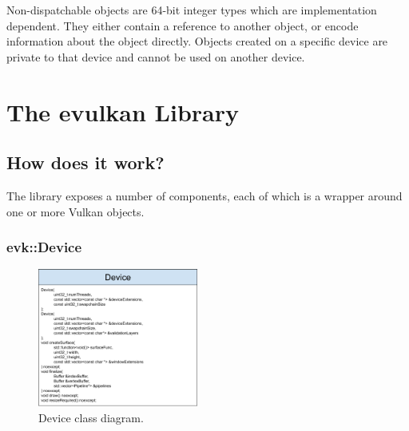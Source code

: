 \documentclass[12pt]{report}
\newcommand{\figurewidth}{0.55\textwidth}
\newcommand{\imagewidth}{0.47\textwidth}
\theoremstyle{definition}
\begin{document}
      Non-dispatchable objects are 64-bit integer types which are
      implementation dependent. They either contain a reference to another
      object, or encode information about the object directly. Objects
      created on a specific device are private to that device and cannot
      be used on another device.

  \chapter{The evulkan Library}

    \section{How does it work?}

      The library exposes a number of components, each of which is a wrapper
      around one or more Vulkan objects.

      \subsection{evk::Device}

        \begin{figure}
          \centering
          \includegraphics[width=\imagewidth]{images/class_device.png}
          \caption{Device class diagram.}
          \label{fig:class_device}  
        \end{figure}
\end{document}
